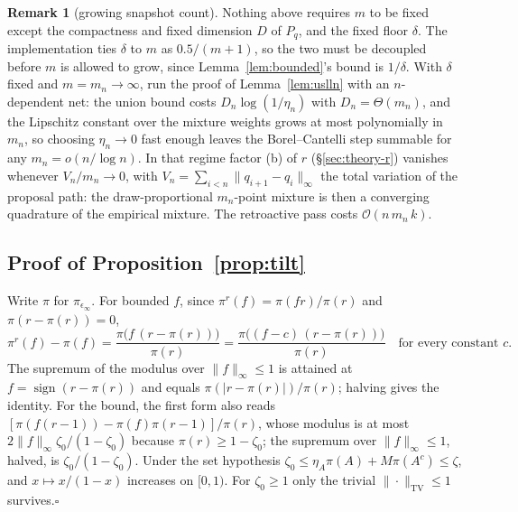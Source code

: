 \documentclass[10pt]{article}
\theoremstyle{plain}
\theoremstyle{definition}
\newtheorem{remark}{Remark}
\begin{document}
\begin{remark}[growing snapshot count]\label{rem:growing-m}
Nothing above requires $m$ to be fixed except the compactness and fixed dimension $D$ of $P_q$, and the fixed floor $\delta$. The implementation ties $\delta$ to $m$ as $0.5/(m{+}1)$, so the two must be decoupled before $m$ is allowed to grow, since Lemma~\ref{lem:bounded}'s bound is $1/\delta$. With $\delta$ fixed and $m=m_n\to\infty$, run the proof of Lemma~\ref{lem:uslln} with an $n$-dependent net: the union bound costs $D_n\log(1/\eta_n)$ with $D_n=\Theta(m_n)$, and the Lipschitz constant over the mixture weights grows at most polynomially in $m_n$, so choosing $\eta_n\to0$ fast enough leaves the Borel--Cantelli step summable for any $m_n=o(n/\log n)$. In that regime factor (b) of $r$ (\S\ref{sec:theory-r}) vanishes whenever $V_n/m_n\to0$, with $V_n=\sum_{i<n}\|q_{i+1}-q_i\|_\infty$ the total variation of the proposal path: the draw-proportional $m_n$-point mixture is then a converging quadrature of the empirical mixture. The retroactive pass costs $\mathcal{O}(n\,m_n\,k)$.
\end{remark}

\subsection{Proof of Proposition~\ref{prop:tilt}}\label{app:theory-tilt}
Write $\pi$ for $\pi_{\epsilon_\infty}$. For bounded $f$, since $\pi^r(f)=\pi(fr)/\pi(r)$ and $\pi(r-\pi(r))=0$,
\[
\pi^r(f)-\pi(f)=\frac{\pi\bigl(f\,(r-\pi(r))\bigr)}{\pi(r)}
=\frac{\pi\bigl((f-c)\,(r-\pi(r))\bigr)}{\pi(r)}\quad\text{for every constant }c .
\]
The supremum of the modulus over $\|f\|_\infty\le1$ is attained at $f=\operatorname{sign}(r-\pi(r))$ and equals $\pi(|r-\pi(r)|)/\pi(r)$; halving gives the identity. For the bound, the first form also reads $[\pi(f(r-1))-\pi(f)\pi(r-1)]/\pi(r)$, whose modulus is at most $2\|f\|_\infty\zeta_0/(1-\zeta_0)$ because $\pi(r)\ge1-\zeta_0$; the supremum over $\|f\|_\infty\le1$, halved, is $\zeta_0/(1-\zeta_0)$. Under the set hypothesis $\zeta_0\le\eta_A\pi(A)+M\pi(A^c)\le\zeta$, and $x\mapsto x/(1-x)$ increases on $[0,1)$. For $\zeta_0\ge1$ only the trivial $\|\cdot\|_{\mathrm{TV}}\le1$ survives.\hfill$\square$
\end{document}
